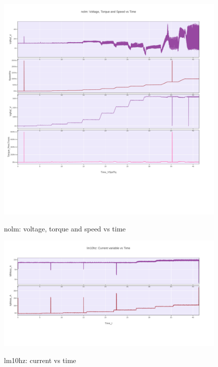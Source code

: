 \documentclass[paper=a4, fontsize=11pt]{scrartcl} %
\numberwithin{equation}{section} %
\numberwithin{figure}{section} %
\numberwithin{table}{section} %
\begin{document}
  \begin{figure}[H]
    \centering
      \href{https://plot.ly/~versag/16/#/}{\includegraphics[width=1\linewidth]{nolm_voltage_torque_speed_vs_time}}
        \caption{nolm: voltage, torque and speed vs time}
  \end{figure}

  \begin{figure}[H]
    \centering
      \href{https://plot.ly/~versag/30/#/}{\includegraphics[width=1\linewidth]{lm10hz_current_vs_time}}
        \caption{lm10hz: current vs time}
  \end{figure}
\end{document}
